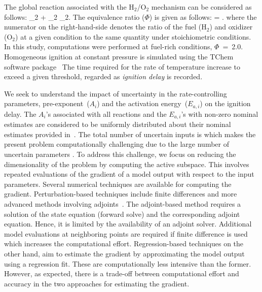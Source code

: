 %
The global reaction associated with the H$_2$/O$_2$ mechanism can
be considered as follows:
_2 + _2 _2.
\label{eq:global}
\ee 
The equivalence ratio ($\Phi$) is given as follows:
%
\be
\Phi = .
\label{eq:phi}
\ee
%
where the numerator on the right-hand-side denotes the ratio of the fuel (H$_2$)
and oxidizer (O$_2$) at a given condition to the same quantity under stoichiometric
conditions. In this study, computations were performed at fuel-rich conditions,
$\Phi$~=~2.0. Homogeneous ignition at constant pressure is simulated using the
TChem software package~\cite{Safta:2011}  The time required for the rate of
temperature increase to exceed a given threshold, regarded as \emph{ignition delay}
is recorded. 

We seek to understand the impact of uncertainty in the
rate-controlling parameters, pre-exponent~($A_i$) and the activation
energy~($E_{a,i}$)  on the ignition delay. The $A_i$'s associated with all
reactions and the $E_{a,i}$'s with non-zero nominal estimates
are considered to be uniformly distributed about their nominal estimates provided
in~\cite{Yetter:1991}.  
The total number of uncertain inputs is  which makes
the present problem computationally challenging due to the large number of 
uncertain parameters .  
To address this challenge, we focus on reducing the dimensionality
of the problem by computing the active subspace.
This involves repeated evaluations of the gradient of a model output with
respect to the input parameters. Several numerical techniques are available
for computing the gradient. Perturbation-based techniques
include finite differences and more advanced methods involving
adjoints~\cite{Jameson:1988,Borzi:2011,Alexanderian:2017}. The
adjoint-based method requires a solution of the state equation (forward solve)
and the corresponding adjoint equation. Hence, it is 
limited by the availability of an adjoint solver. Additional model evaluations
at neighboring points are required if finite difference is used which increases
the computational effort. Regression-based techniques on the other hand,
aim to estimate the
gradient by approximating the model output using a regression fit. These
are computationally less intensive than the former. However, as expected,
there is a trade-off between computational effort and accuracy in the two
approaches for estimating the gradient. 

